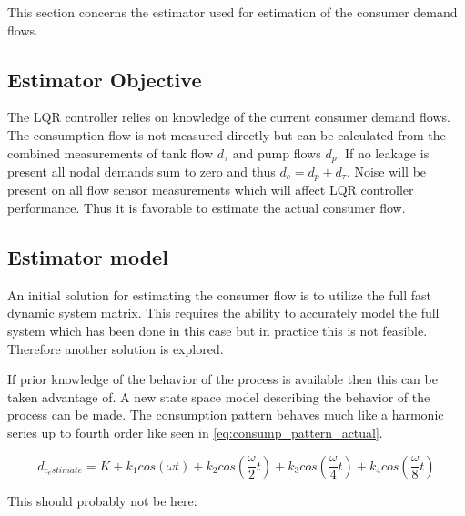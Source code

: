 This section concerns the estimator used for estimation of the consumer demand flows.

\subsection{Estimator Objective}
The LQR controller relies on knowledge of the current  consumer demand flows. The consumption flow is not measured directly but can be calculated from the combined measurements of tank flow $d_\tau$ and pump flows $d_p$. If no leakage is present all nodal demands sum to zero and thus $d_c = d_p + d_\tau$.  Noise will be present on all flow sensor measurements which will affect LQR controller performance. Thus it is favorable to estimate the actual consumer flow.

\subsection{Estimator model}
An initial solution for estimating the consumer flow is to utilize the full fast dynamic system matrix. This requires the ability to accurately model the full system which has been done in this case but in practice this is not feasible. Therefore another solution is explored.

If prior knowledge of the behavior of the process is available then this can be taken advantage of. A new state space model describing the behavior of the process can be made. The consumption pattern behaves much like a harmonic series up to fourth order like seen in \cref{eq:consump_pattern_actual}. 

\begin{equation} \label{eq:consump_pattern_actual}
	d_{c_estimate} = K + k_1 cos(\omega t) + k_2 cos(\frac{\omega}{2} t) + k_3 cos(\frac{\omega}{4} t) + k_4 cos(\frac{\omega}{8} t)
\end{equation}

This should probably not be here:

